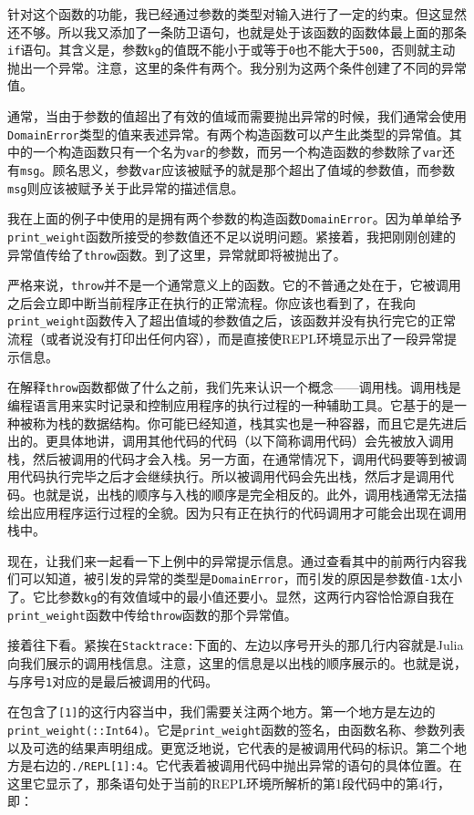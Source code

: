 针对这个函数的功能，我已经通过参数的类型对输入进行了一定的约束。但这显然还不够。所以我又添加了一条防卫语句，也就是处于该函数的函数体最上面的那条\verb|if|语句。其含义是，参数\verb|kg|的值既不能小于或等于\verb|0|也不能大于\verb|500|，否则就主动抛出一个异常。注意，这里的条件有两个。我分别为这两个条件创建了不同的异常值。

通常，当由于参数的值超出了有效的值域而需要抛出异常的时候，我们通常会使用\verb|DomainError|类型的值来表述异常。有两个构造函数可以产生此类型的异常值。其中的一个构造函数只有一个名为\verb|var|的参数，而另一个构造函数的参数除了\verb|var|还有\verb|msg|。顾名思义，参数\verb|var|应该被赋予的就是那个超出了值域的参数值，而参数\verb|msg|则应该被赋予关于此异常的描述信息。

我在上面的例子中使用的是拥有两个参数的构造函数\verb|DomainError|。因为单单给予\verb|print_weight|函数所接受的参数值还不足以说明问题。紧接着，我把刚刚创建的异常值传给了\verb|throw|函数。到了这里，异常就即将被抛出了。

严格来说，\verb|throw|并不是一个通常意义上的函数。它的不普通之处在于，它被调用之后会立即中断当前程序正在执行的正常流程。你应该也看到了，在我向\verb|print_weight|函数传入了超出值域的参数值之后，该函数并没有执行完它的正常流程（或者说没有打印出任何内容），而是直接使REPL环境显示出了一段异常提示信息。

在解释\verb|throw|函数都做了什么之前，我们先来认识一个概念——调用栈。调用栈是编程语言用来实时记录和控制应用程序的执行过程的一种辅助工具。它基于的是一种被称为栈的数据结构。你可能已经知道，栈其实也是一种容器，而且它是先进后出的。更具体地讲，调用其他代码的代码（以下简称调用代码）会先被放入调用栈，然后被调用的代码才会入栈。另一方面，在通常情况下，调用代码要等到被调用代码执行完毕之后才会继续执行。所以被调用代码会先出栈，然后才是调用代码。也就是说，出栈的顺序与入栈的顺序是完全相反的。此外，调用栈通常无法描绘出应用程序运行过程的全貌。因为只有正在执行的代码调用才可能会出现在调用栈中。

现在，让我们来一起看一下上例中的异常提示信息。通过查看其中的前两行内容我们可以知道，被引发的异常的类型是\verb|DomainError|，而引发的原因是参数值\verb|-1|太小了。它比参数\verb|kg|的有效值域中的最小值还要小。显然，这两行内容恰恰源自我在\verb|print_weight|函数中传给\verb|throw|函数的那个异常值。

接着往下看。紧挨在\verb|Stacktrace:|下面的、左边以序号开头的那几行内容就是Julia向我们展示的调用栈信息。注意，这里的信息是以出栈的顺序展示的。也就是说，与序号\verb|1|对应的是最后被调用的代码。

在包含了\verb|[1]|的这行内容当中，我们需要关注两个地方。第一个地方是左边的\verb|print_weight(::Int64)|。它是\verb|print_weight|函数的签名，由函数名称、参数列表以及可选的结果声明组成。更宽泛地说，它代表的是被调用代码的标识。第二个地方是右边的\verb|./REPL[1]:4|。它代表着被调用代码中抛出异常的语句的具体位置。在这里它显示了，那条语句处于当前的REPL环境所解析的第1段代码中的第4行，即：

